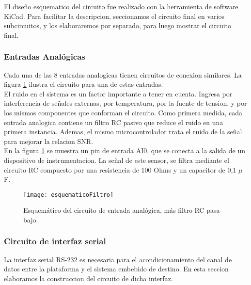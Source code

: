 El diseño esquematico del circuito fue realizado con la herramienta de software KiCad. Para facilitar la descripcion, seccionamos el circuito final en varios subcircuitos, y los elaboraremos por separado, para luego mostrar el circuito final.

\subsubsection{Entradas Analógicas}
\label{it3:ssub:entradas_analogicas}

Cada una de las 8 entradas analogicas tienen circuitos de conexion similares. La figura \ref{fig:esquematicoFiltro} ilustra el circuito para una de estas entradas. \\

El ruido en el sistema es un factor importante a tener en cuenta. Ingresa por interferencia de señales externas, por temperatura, por la fuente de tension, y por los mismos componentes que conforman el circuito. Como primera medida, cada entrada analogica contiene un filtro RC pasivo que reduce el ruido en una primera instancia. Ademas, el mismo microcontrolador trata el ruido de la señal para mejorar la relacion SNR. \\

En la figura \ref{fig:esquematicoFiltro} se muestra un pin de entrada AI0, que se conecta a la salida de un dispositivo de instrumentacion. La señal de este sensor, se filtra mediante el circuito RC compuesto por una resistencia de 100 Ohms y un capacitor de 0,1 $\mu$F.

\begin{figure}[H]
  \centering
  \texttt{[image: esquematicoFiltro]}
  \caption{Esquemático del circuito de entrada analógica, más filtro RC pasa-bajo.}\label{fig:esquematicoFiltro}
\end{figure}


\subsubsection{Circuito de interfaz serial}
\label{it3:ssub:circuito_de_interfaz_serial}

La interfaz serial RS-232 es necesaria para el acondicionamiento del canal de datos entre la plataforma y el sistema embebido de destino. En esta seccion elaboramos la construccion del circuito de dicha interfaz. \\

